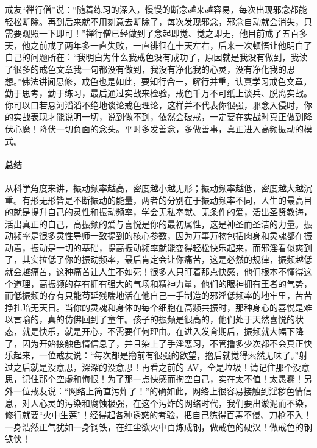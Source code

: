 戒友“禅行僧”说：“随着练习的深入，慢慢的断念越来越容易，每次出现邪念都能轻松断除。再到后来就不用刻意去断除了，每次发现邪念，邪念自动就会消失，只需要观照一下即可！”禅行僧已经做到了念起即觉、觉之即无，他目前戒了五百多天，他之前戒了两年多一直失败，一直徘徊在十天左右，后来一次顿悟让他明白了自己的问题所在：“我明白为什么我戒色没有成功了，原因就是我没有做到，我读了很多的戒色文章我一句都没有做到，我没有净化我的心灵，没有净化我的思想。”佛法讲闻思修，戒色也是如此，要知行合一，解行并重，认真学习戒色文章，勤于思考，勤于练习，最后通过实战来检验，戒色千万不可纸上谈兵、脱离实战。你可以口若悬河滔滔不绝地谈论戒色理论，这样并不代表你很强，邪念入侵时，你的实战表现才能说明一切，说到做不到，依然会破戒，一定要在实战时真正做到降伏心魔！降伏一切负面的念头。平时多发善念，多做善事，真正进入高频振动的模式。

\paragraph*{总结}

从科学角度来讲，振动频率越高，密度越小越无形；振动频率越低，密度越大越沉重。有形无形皆是不断振动的能量，两者的分别在于振动频率不同，人生的最高目的就是提升自己的灵性和振动频率，学会无私奉献、无条件的爱，活出圣贤教诲，活出真正的自己，高振频的爱与喜悦是你的最初属性，这是神圣而圣洁的力量。振动频率是很多灵性导师一致提到的核心参数，因为万事万物包括肉身和灵魂都在振动着，振动是一切的基础，提高振动频率就能变得轻松快乐起来，而邪淫看似爽到了，其实拉低了你的振动频率，最后肯定会让你痛苦，这是必然的规律，振频越低就会越痛苦，这种痛苦让人生不如死！很多人只盯着那点快感，他们根本不懂得这个道理，高振频的存有拥有强大的气场和精神力量，他们的眼神拥有王者的气势，而低振频的存有只能苟延残喘地活在他自己一手制造的邪淫低频率的地牢里，苦苦挣扎暗无天日。当你的灵魂和身体的每个细胞在高频共振时，那种身心的喜悦是难以言喻的，真的仿佛回到了童年。孩子的振频是很高的，他们处于天然喜悦的状态，就是快乐，就是开心，不需要任何理由。在进入发育期后，振频就大幅下降了，因为开始接触色情信息了，并且染上了手淫恶习，不管撸多少次都不会真正快乐起来，一位戒友说：“每次都是撸前有很强的欲望，撸后就觉得索然无味了。”射过之后就是没意思，深深的没意思！再看之前的 AV，全是垃圾！请记住那个没意思，记住那个空虚和悔恨！为了那一点快感而掏空自己，实在太不值！太愚蠢！另外一位戒友说：“网络上简直污炸了！”的确如此，网络上很容易接触到淫秽色情信息，对人心灵的污染和腐蚀极强，在这个污炸的网络时代，我们要出淤泥而不染，修行就要“火中生莲”！经得起各种诱惑的考验，把自己练得百毒不侵、刀枪不入！一身浩然正气犹如一身钢铁，在红尘欲火中百炼成钢，做戒色的硬汉！做戒色的钢铁侠！

